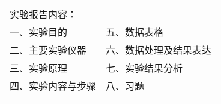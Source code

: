 \begin{flushleft}
\begin{tabular}{p{8.5cm}p{5cm}}
实验报告内容： &                      \\[2pt]

一、实验目的 &               五、数据表格 \\

二、主要实验仪器 &          六、数据处理及结果表达 \\

三、实验原理 &             七、实验结果分析 \\

四、实验内容与步骤 &                 八、习题 \\
&
\end{tabular}  
\end{flushleft}